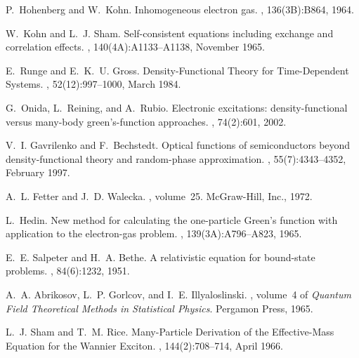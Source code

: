 \documentclass[aps,prb,10pt,showpacs,superscriptaddress,twocolumn,notitlepage]{revtex4-1}
\begin{document}


% 

\begin{thebibliography}{10}

P.~Hohenberg and W.~Kohn.
\newblock Inhomogeneous electron gas.
, 136(3B):B864, 1964.

W.~Kohn and L.~J. Sham.
\newblock Self-consistent equations including exchange and correlation effects.
, 140(4A):A1133--A1138, November 1965.

E.~Runge and E.~K.~U. Gross.
\newblock Density-{Functional} {Theory} for {Time}-{Dependent} {Systems}.
, 52(12):997--1000, March 1984.

G.~Onida, L.~Reining, and A.~Rubio.
\newblock Electronic excitations: density-functional versus many-body
  green's-function approaches.
, 74(2):601, 2002.

V.~I. Gavrilenko and F.~Bechstedt.
\newblock Optical functions of semiconductors beyond density-functional theory
  and random-phase approximation.
, 55(7):4343--4352, February 1997.

A.~L. Fetter and J.~D. Walecka.
, volume~25.
\newblock McGraw-Hill, Inc., 1972.

L.~Hedin.
\newblock New method for calculating the one-particle {Green}'s function with
  application to the electron-gas problem.
, 139(3A):A796--A823, 1965.

E.~E. Salpeter and H.~A. Bethe.
\newblock A relativistic equation for bound-state problems.
, 84(6):1232, 1951.

A.~A. Abrikosov, L.~P. Gorlcov, and I.~E. Illyaloslinski.
, volume~4 of {\em Quantum {Field} {Theoretical} {Methods} in
  {Statistical} {Physics}}.
\newblock Pergamon Press, 1965.

L.~J. Sham and T.~M. Rice.
\newblock Many-{Particle} {Derivation} of the {Effective}-{Mass} {Equation} for
  the {Wannier} {Exciton}.
, 144(2):708--714, April 1966.


\end{thebibliography}
\end{document}
